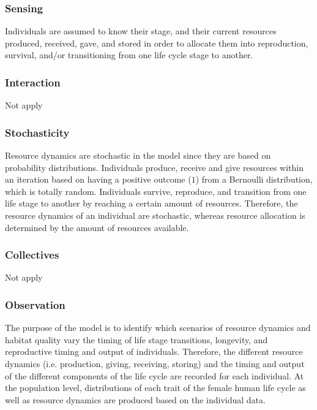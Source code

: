 \documentclass{article}
\begin{document}
\subsubsection{Sensing}

Individuals are assumed to know their stage, and their current resources produced, received, gave, and stored in order to allocate them into reproduction, survival, and/or transitioning from one life cycle stage to another.

\subsubsection{Interaction}

Not apply

\subsubsection{Stochasticity}

Resource dynamics are stochastic in the model since they are based on probability distributions. Individuals produce, receive and give resources within an iteration based on having a positive outcome ($1$) from a Bernoulli distribution, which is totally random. Individuals survive, reproduce, and transition from one life stage to another by reaching a certain amount of resources. Therefore, the resource dynamics of an individual are stochastic, whereas resource allocation is determined by the amount of resources available.

\subsubsection{Collectives}

Not apply

\subsubsection{Observation}

The purpose of the model is to identify which scenarios of resource dynamics and habitat quality vary the timing of life stage transitions, longevity, and reproductive timing and output of individuals. Therefore, the different resource dynamics (i.e. production, giving, receiving, storing) and the timing and output of the different components of the life cycle are recorded for each individual. At the population level, distributions of each trait of the female human life cycle as well as resource dynamics are produced based on the individual data.
\end{document}
